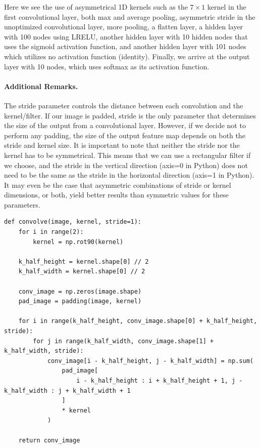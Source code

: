 \documentclass[%
oneside,                 %
final,                   %
10pt]{article}
\begin{document}
Here we see the use of asymmetrical 1D kernels such as the $7 \times
1$ kernel in the first convolutional layer, both max and average
pooling, asymmetric stride in the unoptimized convolutional layer,
more pooling, a flatten layer, a hidden layer with 100 nodes using
LRELU, another hidden layer with 10 hidden nodes that uses the sigmoid
activation function, and another hidden layer with 101 nodes which
utilizes no activation function (identity). Finally, we arrive at the
output layer with 10 nodes, which uses softmax as its activation
function.

\paragraph{Additional Remarks.}
The stride parameter controls the distance between each convolution
and the kernel/filter. If our image is padded, stride is the only
parameter that determines the size of the output from a convolutional
layer. However, if we decide not to perform any padding, the size of
the output feature map depends on both the stride and kernel size. It
is important to note that neither the stride nor the kernel has to be
symmetrical. This means that we can use a rectangular filter if we
choose, and the stride in the vertical direction (axis=0 in Python)
does not need to be the same as the stride in the horizontal direction
(axis=1 in Python). It may even be the case that asymmetric
combinations of stride or kernel dimensions, or both, yield better
results than symmetric values for these parameters.






















\begin{verbatim}
def convolve(image, kernel, stride=1):
    for i in range(2):
        kernel = np.rot90(kernel)

    k_half_height = kernel.shape[0] // 2
    k_half_width = kernel.shape[0] // 2

    conv_image = np.zeros(image.shape)
    pad_image = padding(image, kernel)

    for i in range(k_half_height, conv_image.shape[0] + k_half_height, stride):
        for j in range(k_half_width, conv_image.shape[1] + k_half_width, stride):
            conv_image[i - k_half_height, j - k_half_width] = np.sum(
                pad_image[
                    i - k_half_height : i + k_half_height + 1, j - k_half_width : j + k_half_width + 1
                ]
                * kernel
            )

    return conv_image

\end{verbatim}
\end{document}
